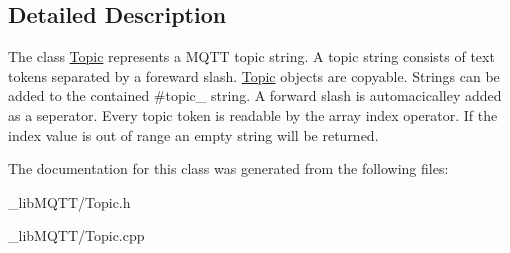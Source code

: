 \subsection{Detailed Description}
The class \hyperlink{class_topic}{Topic} represents a M\+Q\+TT topic string. A topic string consists of text tokens separated by a foreward slash. \hyperlink{class_topic}{Topic} objects are copyable. Strings can be added to the contained \#topic\+\_\+ string. A forward slash is automacicalley added as a seperator. Every topic token is readable by the array index operator. If the index value is out of range an empty string will be returned. 

The documentation for this class was generated from the following files\+:\begin{DoxyCompactItemize}
\item 
\+\_\+lib\+M\+Q\+T\+T/Topic.\+h\item 
\+\_\+lib\+M\+Q\+T\+T/Topic.\+cpp\end{DoxyCompactItemize}
